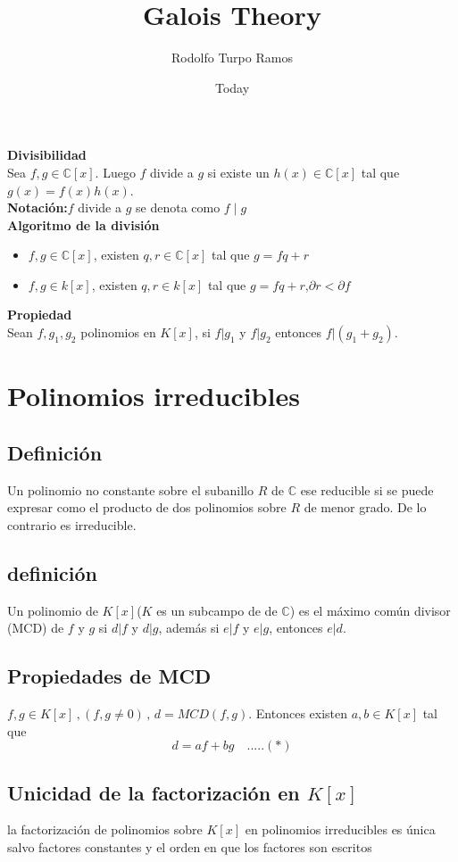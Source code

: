 \documentclass{article}
\title{Galois Theory}
\author{Rodolfo Turpo Ramos}
\date{Today}
\newcommand{\C}{\mathbb C}
\begin{document}
	\maketitle
	\noindent\textbf{\large Divisibilidad}\\
	Sea $f,g\in \C[x]$. Luego $f$ divide a $g$ si existe un $h(x)\in\C[x]$ tal que $g(x)=f(x)h(x)$.\\
	\textbf{Notación:}$f$ divide a $g$ se denota como $f\mid g$\\
	\textbf{\large Algoritmo de la división}
	\begin{itemize}
		\item $f,g\in\C[x]$, existen $q,r\in \C[x]$ tal que $g=fq+r$
		\item $f,g\in k[x]$, existen $q,r\in k[x]$ tal que $g=fq+r$,$\partial r<\partial f$
	\end{itemize}
	\textbf{\large Propiedad}\\
	Sean $f,g_1,g_2$ polinomios en $K[x]$, si $f|g_1$ y $f|g_2$ entonces $f|(g_1+g_2)$.
	\section{Polinomios irreducibles}
	\subsection{Definición}
	Un polinomio no constante sobre el subanillo $R$ de $\C$ ese reducible si se puede expresar como el producto de dos polinomios sobre $R$ de menor grado. De lo contrario es irreducible.
	\subsection{definición}
	Un polinomio de $K[x]$($K$ es un subcampo de de $\C$) es el máximo común divisor (MCD) de $f$ y $g$ si $d|f$ y $d|g$, además si $e|f$ y $e|g$, entonces $e|d$.
	\subsection{Propiedades de MCD}
	$f,g\in K[x]\, ,(f,g\neq 0)\,,\, d=MCD(f,g)$. Entonces existen $a,b\in K[x]$ tal que\[d=af+bg\quad .....(*)\]
	\subsection{Unicidad de la factorización en $K[x]$}
	la factorización de polinomios sobre $K[x]$ en polinomios irreducibles es única salvo factores constantes y el orden en que los factores son escritos
\end{document}
